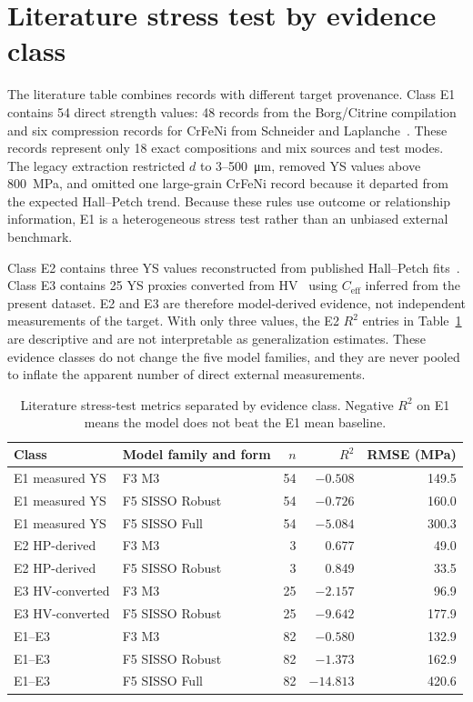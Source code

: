\documentclass[a4paper,11pt]{article}
\begin{document}
\section{Literature stress test by evidence class}
\label{si:external}

The literature table combines records with different target provenance. Class E1 contains 54 direct strength values: 48 records from the Borg/Citrine compilation~\cite{Borg2020} and six compression records for CrFeNi from Schneider and Laplanche~\cite{SchneiderCrFeNi2021}. These records represent only 18 exact compositions and mix sources and test modes. The legacy extraction restricted $d$ to 3--\SI{500}{\micro\meter}, removed YS values above \SI{800}{MPa}, and omitted one large-grain CrFeNi record because it departed from the expected Hall--Petch trend. Because these rules use outcome or relationship information, E1 is a heterogeneous stress test rather than an unbiased external benchmark.

Class E2 contains three YS values reconstructed from published Hall--Petch fits~\cite{Otto2013}. Class E3 contains 25 YS proxies converted from HV~\cite{HuangTY2019} using $C_{\mathrm{eff}}$ inferred from the present dataset. E2 and E3 are therefore model-derived evidence, not independent measurements of the target. With only three values, the E2 $R^2$ entries in Table~\ref{tab:external} are descriptive and are not interpretable as generalization estimates. These evidence classes do not change the five model families, and they are never pooled to inflate the apparent number of direct external measurements.

\begin{table}[H]
\centering
\caption{Literature stress-test metrics separated by evidence class. Negative $R^2$ on E1 means the model does not beat the E1 mean baseline.}
\label{tab:external}
\small
\begin{tabular}{llrrr}
\toprule
Class & Model family and form & $n$ & $R^2$ & RMSE (MPa) \\
\midrule
E1 measured YS & F3 M3 & 54 & $-0.508$ & 149.5 \\
E1 measured YS & F5 SISSO Robust & 54 & $-0.726$ & 160.0 \\
E1 measured YS & F5 SISSO Full & 54 & $-5.084$ & 300.3 \\
E2 HP-derived & F3 M3 & 3 & 0.677 & 49.0 \\
E2 HP-derived & F5 SISSO Robust & 3 & 0.849 & 33.5 \\
E3 HV-converted & F3 M3 & 25 & $-2.157$ & 96.9 \\
E3 HV-converted & F5 SISSO Robust & 25 & $-9.642$ & 177.9 \\
\midrule
E1--E3 & F3 M3 & 82 & $-0.580$ & 132.9 \\
E1--E3 & F5 SISSO Robust & 82 & $-1.373$ & 162.9 \\
E1--E3 & F5 SISSO Full & 82 & $-14.813$ & 420.6 \\
\bottomrule
\end{tabular}
\end{table}
\end{document}
